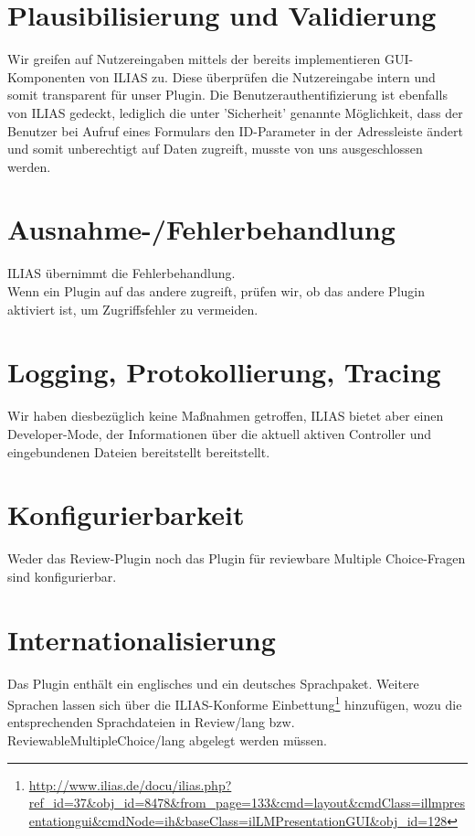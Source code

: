 \documentclass[a4paper]{scrreprt}
\begin{document}
\section{Plausibilisierung und Validierung}

Wir greifen auf Nutzereingaben mittels der bereits implementieren GUI-Komponenten von ILIAS zu. 
Diese überprüfen die Nutzereingabe intern und somit transparent für unser Plugin. 
Die Benutzerauthentifizierung ist ebenfalls von ILIAS gedeckt, lediglich die unter 'Sicherheit' genannte Möglichkeit, dass der Benutzer bei Aufruf eines Formulars den ID-Parameter in der Adressleiste ändert und somit unberechtigt auf Daten zugreift, musste von uns ausgeschlossen werden.

\section{Ausnahme-/Fehlerbehandlung}

ILIAS übernimmt die Fehlerbehandlung.\\
Wenn ein Plugin auf das andere zugreift, prüfen wir, ob das andere Plugin aktiviert ist, um Zugriffsfehler zu vermeiden.

\section{Logging, Protokollierung, Tracing}

Wir haben diesbezüglich keine Maßnahmen getroffen, ILIAS bietet aber einen Developer-Mode, der Informationen über die aktuell aktiven Controller und eingebundenen Dateien bereitstellt bereitstellt.

\section{Konfigurierbarkeit}

Weder das Review-Plugin noch das Plugin für reviewbare Multiple Choice-Fragen sind konfigurierbar.

\section{Internationalisierung}

Das Plugin enthält ein englisches und ein deutsches Sprachpaket. 
Weitere Sprachen lassen sich über die ILIAS-Konforme Einbettung\footnote{\url{http://www.ilias.de/docu/ilias.php?ref_id=37&obj_id=8478&from_page=133&cmd=layout&cmdClass=illmpresentationgui&cmdNode=ih&baseClass=ilLMPresentationGUI&obj_id=128}} 
 hinzufügen, wozu die entsprechenden Sprachdateien in Review/lang bzw. 
ReviewableMultipleChoice/lang abgelegt werden müssen.
\end{document}
